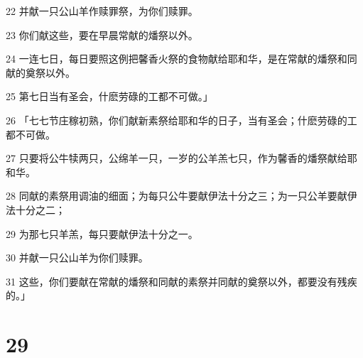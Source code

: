 \par 22 并献一只公山羊作赎罪祭，为你们赎罪。
\par 23 你们献这些，要在早晨常献的燔祭以外。
\par 24 一连七日，每日要照这例把馨香火祭的食物献给耶和华，是在常献的燔祭和同献的奠祭以外。
\par 25 第七日当有圣会，什麽劳碌的工都不可做。」
\par 26 「七七节庄稼初熟，你们献新素祭给耶和华的日子，当有圣会；什麽劳碌的工都不可做。
\par 27 只要将公牛犊两只，公绵羊一只，一岁的公羊羔七只，作为馨香的燔祭献给耶和华。
\par 28 同献的素祭用调油的细面；为每只公牛要献伊法十分之三；为一只公羊要献伊法十分之二；
\par 29 为那七只羊羔，每只要献伊法十分之一。
\par 30 并献一只公山羊为你们赎罪。
\par 31 这些，你们要献在常献的燔祭和同献的素祭并同献的奠祭以外，都要没有残疾的。」

\chapter{29}

